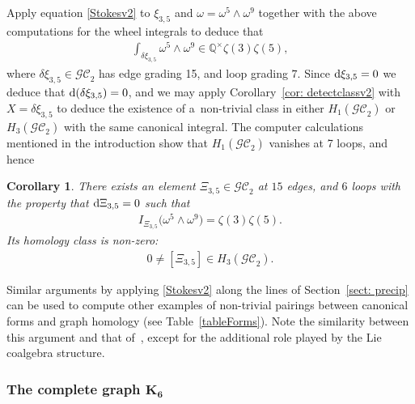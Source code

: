 \documentclass[pdftex]{sigma}%
\newtheorem{cor}[thm]{Corollary}
\numberwithin{equation}{section}
\newcommand{\Q}{\mathbb Q}
\newcommand{\GC}{\mathcal{GC}}
\newcommand{\0}{\color{blue}{\mathsf{0}}}
\begin{document}
 Apply equation \eqref{Stokesv2} to $\xi_{3,5}$ and $\omega= \omega^5 \wedge \omega^9$ together with the above computations for the wheel integrals to deduce that
\begin{gather*}
\int_{\delta \xi_{3,5}} \omega^5 \wedge \omega^9 \in \Q^{\times} \zeta(3) \zeta(5),
\end{gather*}
where $\delta \xi_{3,5} \in \GC_2$ has edge grading 15, and loop grading $7$.
Since ${\rm d} \xi_{3,5}=0$ we deduce that ${\rm d} (\delta \xi_{3,5})= 0$, and we may apply Corollary~\ref{cor: detectclassv2} with $X= \delta \xi_{3,5}$ to deduce the existence of a~non-trivial class in either $H_1(\GC_2)$ or $H_3(\GC_2)$ with the same canonical integral. The computer calculations mentioned in the introduction show that $H_1(\GC_2)$ vanishes at 7 loops, and hence
\begin{cor}
There exists an element
$\Xi_{3,5} \in \GC_2$ at $15$ edges, and $6$ loops with the property that ${\rm d} \Xi_{3,5}=0$
 such that
 \begin{gather*}
 I_{\Xi_{3,5}}\big(\omega^5 \wedge \omega^9\big) = \zeta(3) \zeta(5).
 \end{gather*}
Its homology class is non-zero:
\begin{gather*}
0 \neq [\Xi_{3,5}] \in H_3(\GC_2).
\end{gather*}
 \end{cor}

 Similar arguments by applying \eqref{Stokesv2} along the lines of Section~\ref{sect: precip} can be used to compute
other examples of non-trivial pairings between canonical forms and graph homology (see Table~\ref{tableForms}). Note the similarity between this argument and that of~\cite{SpectralSequenceGC2}, except for the additional role played by the Lie coalgebra structure.

\subsubsection[The complete graph K6]{The complete graph $\boldsymbol{K_6}$}
\end{document}
